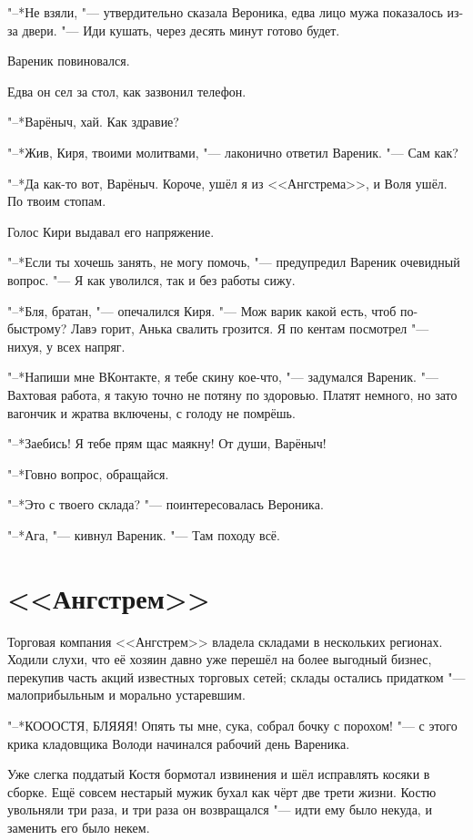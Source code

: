 "--*Не взяли, "--- утвердительно сказала Вероника, едва лицо мужа показалось из-за двери.
"--- Иди кушать, через десять минут готово будет.

Вареник повиновался.

Едва он сел за стол, как зазвонил телефон.

"--*Варёныч, хай.
Как здравие?

"--*Жив, Киря, твоими молитвами, "--- лаконично ответил Вареник.
"--- Сам как?

"--*Да как-то вот, Варёныч.
Короче, ушёл я из <<Ангстрема>>, и Воля ушёл.
По твоим стопам.

Голос Кири выдавал его напряжение.

"--*Если ты хочешь занять, не могу помочь, "--- предупредил Вареник очевидный вопрос.
"--- Я как уволился, так и без работы сижу.

"--*Бля, братан, "--- опечалился Киря.
"--- Мож варик какой есть, чтоб по-быстрому?
Лавэ горит, Анька свалить грозится.
Я по кентам посмотрел "--- нихуя, у всех напряг.

"--*Напиши мне ВКонтакте, я тебе скину кое-что, "--- задумался Вареник.
"--- Вахтовая работа, я такую точно не потяну по здоровью.
Платят немного, но зато вагончик и жратва включены, с голоду не помрёшь.

"--*Заебись!
Я тебе прям щас маякну!
От души, Варёныч!

"--*Говно вопрос, обращайся.

"--*Это с твоего склада? "--- поинтересовалась Вероника.

"--*Ага, "--- кивнул Вареник.
"--- Там походу всё.

\section{<<Ангстрем>>}

Торговая компания <<Ангстрем>> владела складами в нескольких регионах.
Ходили слухи, что её хозяин давно уже перешёл на более выгодный бизнес, перекупив часть акций известных торговых сетей;
склады остались придатком "--- малоприбыльным и морально устаревшим.

"--*КОООСТЯ, БЛЯЯЯ!
Опять ты мне, сука, собрал бочку с порохом! "--- с этого крика кладовщика Володи начинался рабочий день Вареника.

Уже слегка поддатый Костя бормотал извинения и шёл исправлять косяки в сборке.
Ещё совсем нестарый мужик бухал как чёрт две трети жизни.
Костю увольняли три раза, и три раза он возвращался "--- идти ему было некуда, и заменить его было некем.

